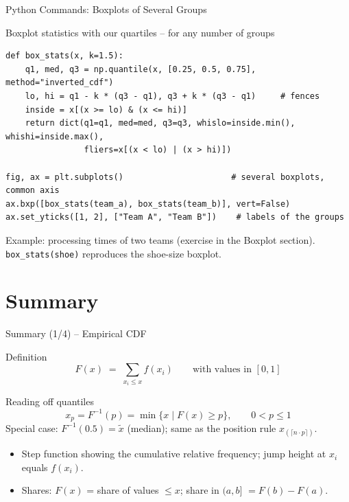 \documentclass[aspectratio=169,11pt]{beamer}
\begin{document}
\begin{frame}[fragile]{Python Commands: Boxplots of Several Groups}
  \begin{block}{Boxplot statistics with our quartiles -- for any number of groups}
    \begin{lstlisting}
def box_stats(x, k=1.5):
    q1, med, q3 = np.quantile(x, [0.25, 0.5, 0.75], method="inverted_cdf")
    lo, hi = q1 - k * (q3 - q1), q3 + k * (q3 - q1)     # fences
    inside = x[(x >= lo) & (x <= hi)]
    return dict(q1=q1, med=med, q3=q3, whislo=inside.min(), whishi=inside.max(),
                fliers=x[(x < lo) | (x > hi)])

fig, ax = plt.subplots()                      # several boxplots, common axis
ax.bxp([box_stats(team_a), box_stats(team_b)], vert=False)
ax.set_yticks([1, 2], ["Team A", "Team B"])    # labels of the groups
    \end{lstlisting}
  \end{block}
  \footnotesize Example: processing times of two teams (exercise in the Boxplot
  section). \texttt{box\_stats(shoe)} reproduces the shoe-size boxplot.
\end{frame}

\section{Summary}

\begin{frame}{Summary (1/4) -- Empirical CDF}
  \begin{block}{Definition}
    \[
      F(x) \;=\; \sum_{x_i \leq x} f(x_i)
      \qquad \text{with values in } [0,1]
    \]
  \end{block}
  \begin{block}{Reading off quantiles}
    \[
      x_{p} = F^{-1}(p) = \min\{x \mid F(x) \geq p\},
      \qquad 0 < p \leq 1
    \]
    Special case: $F^{-1}(0.5) = \tilde{x}$ (median); same as the position rule
    $x_{(\lceil n \cdot p \rceil)}$.
  \end{block}
  \begin{itemize}
    \item Step function showing the cumulative relative frequency; jump height at
          $x_i$ equals $f(x_i)$.
    \item Shares: $F(x)$ = share of values $\le x$; share in $(a,b]$ $= F(b) - F(a)$.
  \end{itemize}
\end{frame}
\end{document}
